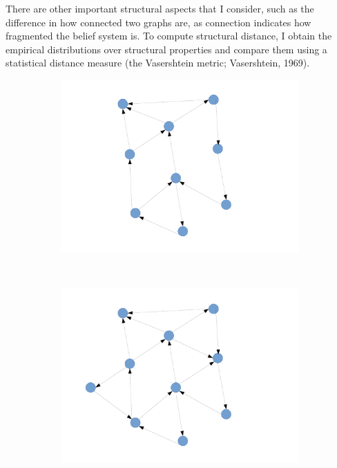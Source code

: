 \documentclass[12pt]{article}
\begin{document}
There are other important structural aspects that I consider, such as the difference in how connected two graphs are, as connection indicates how fragmented the belief system is. To compute structural distance, I obtain the empirical distributions over structural properties and compare them using a statistical distance measure (the Vasershtein metric; Vasershtein, 1969). 

\begin{figure}
        \centering
        \begin{subfigure}[C]{0.7\textwidth}
                \centering
                \includegraphics[width=\textwidth]{GraphC.pdf}
                \subcaption{}
                \label{graphc}
        \end{subfigure}%
        ~ %
        \begin{subfigure}[D]{0.7\textwidth}
                \centering
                \includegraphics[width=\textwidth]{GraphD.pdf}

\end{subfigure}
\end{figure}
\end{document}

